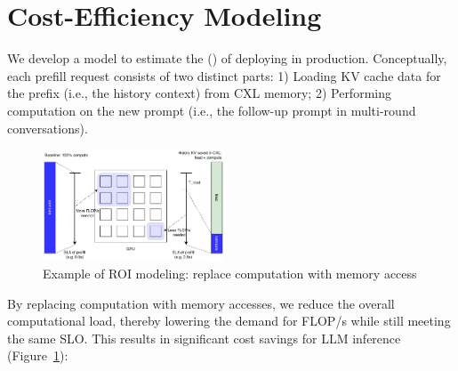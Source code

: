 \section{Cost-Efficiency Modeling}
\label{sec:roi}

We develop a model to estimate the \roifull (\roi) of deploying \tool in production.
Conceptually, each prefill request consists of two distinct parts: 1) Loading KV cache data for the prefix (i.e., the history context) from CXL memory; 2) Performing computation on the new prompt (i.e., the follow-up prompt in multi-round conversations).

\begin{figure}
    \includegraphics[width=0.48\textwidth]{fig/future/roi_explanation.pdf}
 \caption{Example of ROI modeling: replace computation with memory access}
    \label{fig:roi-modeling}
\end{figure}

By replacing computation with memory accesses, we reduce the overall computational load, thereby lowering the demand for FLOP/s while still meeting the same SLO. This results in significant cost savings for LLM inference (Figure~\ref{fig:roi-modeling}):

